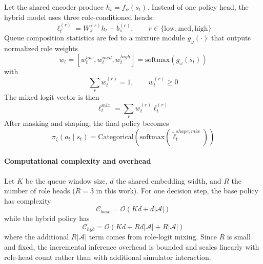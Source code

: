\documentclass[journal]{IEEEtran}
\begin{document}
Let the shared encoder produce $h_t=f_\psi(s_t)$. Instead of one policy head, the hybrid model uses three role-conditioned heads:
\begin{equation}
\ell_t^{(r)} = W_{\pi}^{(r)} h_t + b_{\pi}^{(r)},\qquad r \in \{\text{low},\text{med},\text{high}\}
\end{equation}
Queue composition statistics are fed to a mixture module $g_\omega(\cdot)$ that outputs normalized role weights
\begin{equation}
w_t = [w_t^{low}, w_t^{med}, w_t^{high}] = \text{softmax}(g_\omega(s_t))
\end{equation}
with
\begin{equation}
\sum_r w_t^{(r)} = 1,\qquad w_t^{(r)} \geq 0
\end{equation}
The mixed logit vector is then
\begin{equation}
\ell_t^{mix} = \sum_{r} w_t^{(r)} \ell_t^{(r)}
\label{eq:mixlogits}
\end{equation}
After masking and shaping, the final policy becomes
\begin{equation}
\pi_\zeta(a_t\mid s_t)=\text{Categorical}(\text{softmax}(\tilde{\ell}^{shape,mix}_t))
\end{equation}
\paragraph{Computational complexity and overhead}
Let $K$ be the queue window size, $d$ the shared embedding width, and $R$ the number of role heads ($R=3$ in this work). For one decision step, the base policy has complexity
\begin{equation}
\mathcal{C}_{base} = \mathcal{O}(K d + d|\mathcal{A}|)
\end{equation}
while the hybrid policy has
\begin{equation}
\mathcal{C}_{hyb} = \mathcal{O}(K d + R d|\mathcal{A}| + R|\mathcal{A}|)
\end{equation}
where the additional $R|\mathcal{A}|$ term comes from role-logit mixing. Since $R$ is small and fixed, the incremental inference overhead is bounded and scales linearly with role-head count rather than with additional simulator interaction.
\end{document}
